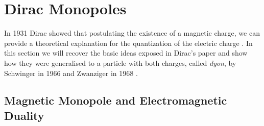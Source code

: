 \documentclass[main.tex]{subfiles}
\begin{document}
\section{Dirac Monopoles}\label{sect:Dirac}
In 1931 Dirac showed that postulating the existence of a magnetic charge, we can provide a theoretical explanation for the quantization of the electric charge \cite{Dirac}. 
In this section we will recover the basic ideas exposed in Dirac's paper and show how they were generalised to a particle with both charges, called \emph{dyon}, by Schwinger in 1966 \cite{S:dyon} and Zwanziger in 1968 \cite{Z:dyon}.


\subsection{Magnetic Monopole and Electromagnetic Duality}
\end{document}
